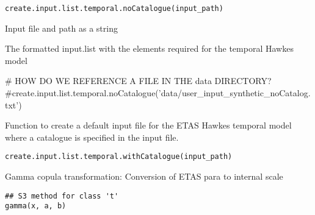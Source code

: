 \documentclass[letterpaper]{book}
\begin{document}
%
\begin{Usage}
\begin{verbatim}
create.input.list.temporal.noCatalogue(input_path)
\end{verbatim}
\end{Usage}
%
\begin{Arguments}
\begin{ldescription}
\item[\code{input\_path}] Input file and path as a string
\end{ldescription}
\end{Arguments}
%
\begin{Value}
The formatted input.list with the elements required for the temporal Hawkes model
\end{Value}
%
\begin{Examples}
\begin{ExampleCode}
# HOW DO WE REFERENCE A FILE IN THE data DIRECTORY?
#create.input.list.temporal.noCatalogue('data/user_input_synthetic_noCatalog.txt')
\end{ExampleCode}
\end{Examples}
%
\begin{Description}\relax
Function to create a default input file for the ETAS Hawkes temporal model where a catalogue is specified in the input file.
\end{Description}
%
\begin{Usage}
\begin{verbatim}
create.input.list.temporal.withCatalogue(input_path)
\end{verbatim}
\end{Usage}
%
\begin{Arguments}
\begin{ldescription}
\item[\code{input\_path}] 
\end{ldescription}
\end{Arguments}
%
\begin{Description}\relax
Gamma copula transformation: Conversion of ETAS para to internal scale
\end{Description}
%
\begin{Usage}
\begin{verbatim}
## S3 method for class 't'
gamma(x, a, b)
\end{verbatim}
\end{Usage}
\end{document}
